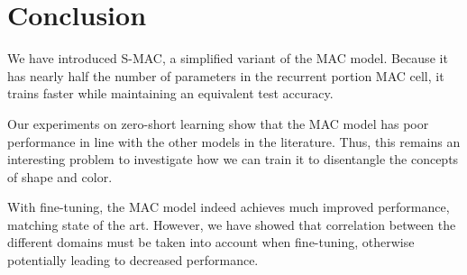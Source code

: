 \section{Conclusion}
We have introduced S-MAC, a simplified variant of the MAC model. Because it has nearly half the number of parameters in the recurrent portion MAC cell, it trains faster while maintaining an equivalent test accuracy. 

Our experiments on zero-short learning show that the MAC model has poor performance in line with the other models in the literature. Thus, this remains an interesting problem to investigate how we can train it to disentangle the concepts of shape and color.

With fine-tuning, the MAC model indeed achieves much improved performance, matching state of the art. However, we have showed that correlation between the different domains must be taken into account when fine-tuning, otherwise potentially leading to decreased performance.